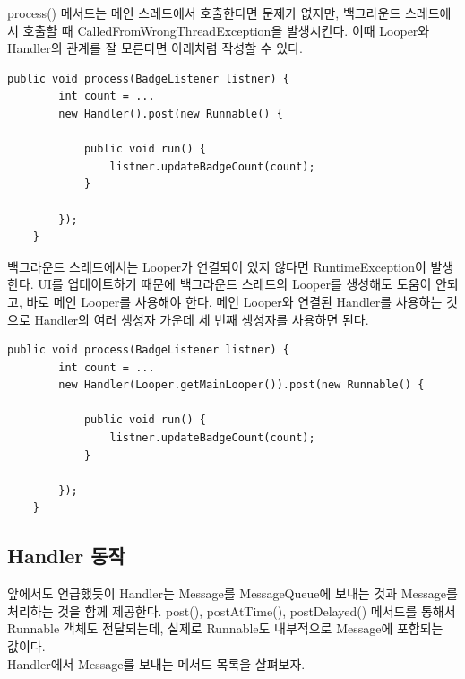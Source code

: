 process() 메서드는 메인 스레드에서 호출한다면 문제가 없지만, 백그라운드 스레드에서 호출할 때 CalledFromWrongThreadException을 발생시킨다. 
이때 Looper와 Handler의 관계를 잘 모른다면 아래처럼 작성할 수 있다.
\begin{lstlisting}[frame=single] 
	public void process(BadgeListener listner) {
		int count = ...
		new Handler().post(new Runnable() {
		
			public void run() {
				listner.updateBadgeCount(count);
			}
			
		});
	}
\end{lstlisting}	
백그라운드 스레드에서는 Looper가 연결되어 있지 않다면 RuntimeException이 발생한다.
UI를 업데이트하기 때문에 백그라운드 스레드의 Looper를 생성해도 도움이 안되고, 바로 메인 Looper를 사용해야 한다. 메인 Looper와 연결된 Handler를 사용하는 것으로 Handler의 여러 생성자 가운데 세 번째 생성자를 사용하면 된다.
\begin{lstlisting}[frame=single] 
	public void process(BadgeListener listner) {
		int count = ...
		new Handler(Looper.getMainLooper()).post(new Runnable() {
		
			public void run() {
				listner.updateBadgeCount(count);
			}
			
		});
	}
\end{lstlisting}

\subsection{Handler 동작}
앞에서도 언급했듯이 Handler는 Message를 MessageQueue에 보내는 것과 Message를 처리하는 것을 함께 제공한다. post(), postAtTime(), postDelayed() 메서드를 통해서 Runnable 객체도 전달되는데, 실제로 Runnable도 내부적으로 Message에 포함되는 값이다.\\

Handler에서 Message를 보내는 메서드 목록을 살펴보자.\\

\newline

